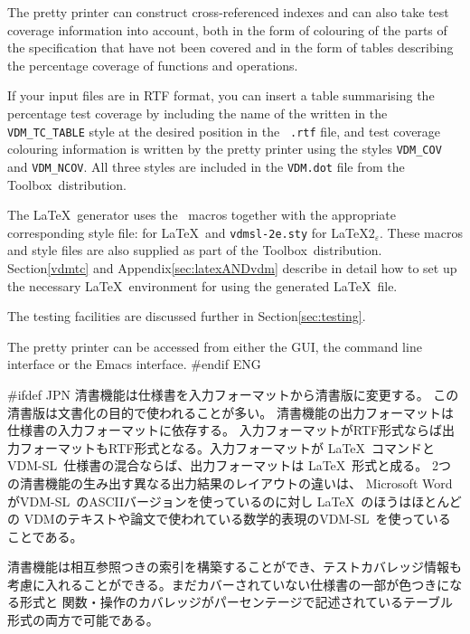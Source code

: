 \documentclass[\pformat,12pt]{article}
\newcommand{\vdmslpp}{VDM-SL}
\newcommand{\Toolbox}{Toolbox}
\newcommand{\VdmSlPp}{\VdmSl}
\newcommand{\vdmslpp}{VDM++}
\newcommand{\Toolbox}{Toolbox}
\DeclareRobustCommand{\VdmSlPp}{VDM++-\VdmSl}
\begin{document}
The pretty printer can construct cross-referenced indexes and can also
take test coverage information into account, both in the form of
colouring of the parts of the specification that have not been covered
and in the form of tables describing the percentage coverage of
functions and operations.

If your input files are in  RTF format, you can insert a table
summarising the percentage test coverage by including the name of the
 written in the
\texttt{VDM\_TC\_TABLE} style at the desired position in the {\tt
  .rtf} file, and test coverage colouring information is written by the
pretty printer using the styles \texttt{VDM\_COV} and
\texttt{VDM\_NCOV}. All three styles are included in the {\tt VDM.dot} 
file from the \Toolbox\ distribution.

The \LaTeX\ generator uses the \VdmSlPp\ macros together with the
appropriate corresponding style file:
 for \LaTeX\ and 
{\tt vdmsl-2e.sty} for \LaTeX$2_{\varepsilon}$. These macros and style
files are also supplied as part of the \Toolbox\
distribution. Section\ref{vdmtc} and Appendix\ref{sec:latexANDvdm}
describe in detail how to set up the necessary \LaTeX\ environment for
using the generated \LaTeX\ file.

The testing facilities are discussed further in
Section\ref{sec:testing}.

The pretty printer can be accessed from either the GUI, the
command line interface or the Emacs interface.
#endif ENG

#ifdef JPN
清書機能は仕様書を入力フォーマットから清書版に変更する。
この清書版は文書化の目的で使われることが多い。
清書機能の出力フォーマットは仕様書の入力フォーマットに依存する。
入力フォーマットがRTF形式ならば出力フォーマットもRTF形式となる。入力フォーマットが
 \LaTeX\ コマンドと\vdmslpp\ 仕様書の混合ならば、出力フォーマットは \LaTeX\ 形式と成る。
2つの清書機能の生み出す異なる出力結果のレイアウトの違いは、
Microsoft Wordが\vdmslpp\ のASCIIバージョンを使っているのに対し \LaTeX\ のほうはほとんどの
VDMのテキストや論文で使われている数学的表現の\vdmslpp\ を使っていることである。

清書機能は相互参照つきの索引を構築することができ、テストカバレッジ情報も
考慮に入れることができる。まだカバーされていない仕様書の一部が色つきになる形式と
関数・操作のカバレッジがパーセンテージで記述されているテーブル形式の両方で可能である。
\end{document}

